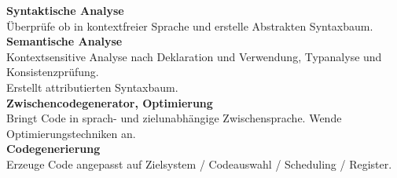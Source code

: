 \textbf{Syntaktische Analyse}\\
Überprüfe ob in kontextfreier Sprache und erstelle Abstrakten Syntaxbaum.\\

\textbf{Semantische Analyse}\\
Kontextsensitive Analyse nach Deklaration und Verwendung, Typanalyse und Konsistenzprüfung.\\
Erstellt attributierten Syntaxbaum.\\

\textbf{Zwischencodegenerator, Optimierung}\\
Bringt Code in sprach- und zielunabhängige Zwischensprache. Wende Optimierungstechniken an.\\

\textbf{Codegenerierung}\\
Erzeuge Code angepasst auf Zielsystem / Codeauswahl / Scheduling / Register.
